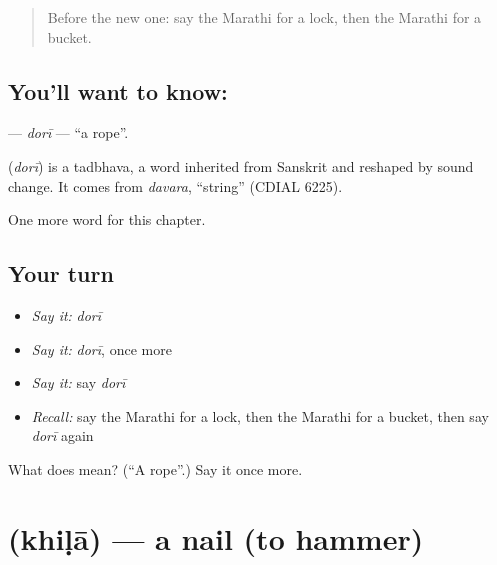 \label{lesson:MR-C131-dori}



\begin{quote}
Before the new one: say the Marathi for a lock, then the Marathi for a bucket.
\end{quote}

\subsection*{You'll want to know: }
\textbf{} — \emph{dorī} — \textquotedblleft{}a rope\textquotedblright{}.

\begin{cousinweb}
\textbf{} (\emph{dorī}) is a tadbhava, a word inherited from Sanskrit and reshaped by sound change. It comes from \emph{davara}, \textquotedblleft{}string\textquotedblright{} (CDIAL 6225).
\end{cousinweb}

\begin{grammarlens}[title={What you've built}]
One more word for this chapter.
\end{grammarlens}

\subsection*{Your turn}
\begin{itemize}
\raggedright
  \item \emph{Say it:} \emph{dorī}
  \item \emph{Say it:} \emph{dorī}, once more
  \item \emph{Say it:} say \emph{dorī}
  \item \emph{Recall:} say the Marathi for a lock, then the Marathi for a bucket, then say \emph{dorī} again
\end{itemize}

\begin{tcolorbox}[breakable,colback=teal!4,colframe=teal!35!black,title={Before you move on}]
What does  mean? (\textquotedblleft{}A rope\textquotedblright{}.) Say it once more.
\end{tcolorbox}
\section[\texorpdfstring{\mr{खिळा} (khiḷā)}{खिळा (khiḷā)}]{ (khiḷā) — a nail (to hammer)}

\label{lesson:MR-C131-khila}



